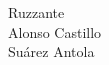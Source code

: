 \documentclass[
11pt, %
spanish,
singlespacing, %
parskip, %
headsepline, %
]{MastersDoctoralThesis} %
\begin{document}
\begin{center}

\vspace{1.5cm}
Ruzzante \\ %
Alonso Castillo \\ %
Suárez Antola \\

\vspace{4.5cm}

\large
 



\end{center}
\end{document}
